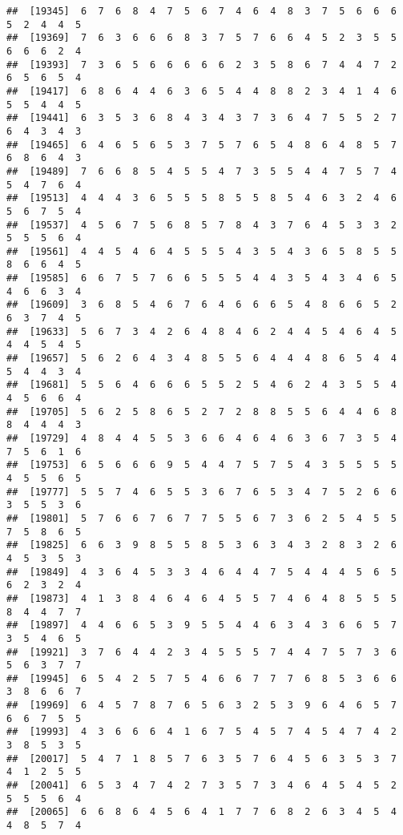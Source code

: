 \documentclass[
]{book}
\begin{document}
\begin{verbatim}
##  [19345]  6  7  6  8  4  7  5  6  7  4  6  4  8  3  7  5  6  6  6  5  2  4  4  5
##  [19369]  7  6  3  6  6  6  8  3  7  5  7  6  6  4  5  2  3  5  5  6  6  6  2  4
##  [19393]  7  3  6  5  6  6  6  6  6  2  3  5  8  6  7  4  4  7  2  6  5  6  5  4
##  [19417]  6  8  6  4  4  6  3  6  5  4  4  8  8  2  3  4  1  4  6  5  5  4  4  5
##  [19441]  6  3  5  3  6  8  4  3  4  3  7  3  6  4  7  5  5  2  7  6  4  3  4  3
##  [19465]  6  4  6  5  6  5  3  7  5  7  6  5  4  8  6  4  8  5  7  6  8  6  4  3
##  [19489]  7  6  6  8  5  4  5  5  4  7  3  5  5  4  4  7  5  7  4  5  4  7  6  4
##  [19513]  4  4  4  3  6  5  5  5  8  5  5  8  5  4  6  3  2  4  6  5  6  7  5  4
##  [19537]  4  5  6  7  5  6  8  5  7  8  4  3  7  6  4  5  3  3  2  5  5  5  6  4
##  [19561]  4  4  5  4  6  4  5  5  5  4  3  5  4  3  6  5  8  5  5  8  6  6  4  5
##  [19585]  6  6  7  5  7  6  6  5  5  5  4  4  3  5  4  3  4  6  5  4  6  6  3  4
##  [19609]  3  6  8  5  4  6  7  6  4  6  6  6  5  4  8  6  6  5  2  6  3  7  4  5
##  [19633]  5  6  7  3  4  2  6  4  8  4  6  2  4  4  5  4  6  4  5  4  4  5  4  5
##  [19657]  5  6  2  6  4  3  4  8  5  5  6  4  4  4  8  6  5  4  4  5  4  4  3  4
##  [19681]  5  5  6  4  6  6  6  5  5  2  5  4  6  2  4  3  5  5  4  4  5  6  6  4
##  [19705]  5  6  2  5  8  6  5  2  7  2  8  8  5  5  6  4  4  6  8  8  4  4  4  3
##  [19729]  4  8  4  4  5  5  3  6  6  4  6  4  6  3  6  7  3  5  4  7  5  6  1  6
##  [19753]  6  5  6  6  6  9  5  4  4  7  5  7  5  4  3  5  5  5  5  4  5  5  6  5
##  [19777]  5  5  7  4  6  5  5  3  6  7  6  5  3  4  7  5  2  6  6  3  5  5  3  6
##  [19801]  5  7  6  6  7  6  7  7  5  5  6  7  3  6  2  5  4  5  5  7  5  8  6  5
##  [19825]  6  6  3  9  8  5  5  8  5  3  6  3  4  3  2  8  3  2  6  4  5  3  5  3
##  [19849]  4  3  6  4  5  3  3  4  6  4  4  7  5  4  4  4  5  6  5  6  2  3  2  4
##  [19873]  4  1  3  8  4  6  4  6  4  5  5  7  4  6  4  8  5  5  5  8  4  4  7  7
##  [19897]  4  4  6  6  5  3  9  5  5  4  4  6  3  4  3  6  6  5  7  3  5  4  6  5
##  [19921]  3  7  6  4  4  2  3  4  5  5  5  7  4  4  7  5  7  3  6  5  6  3  7  7
##  [19945]  6  5  4  2  5  7  5  4  6  6  7  7  7  6  8  5  3  6  6  3  8  6  6  7
##  [19969]  6  4  5  7  8  7  6  5  6  3  2  5  3  9  6  4  6  5  7  6  6  7  5  5
##  [19993]  4  3  6  6  6  4  1  6  7  5  4  5  7  4  5  4  7  4  2  3  8  5  3  5
##  [20017]  5  4  7  1  8  5  7  6  3  5  7  6  4  5  6  3  5  3  7  4  1  2  5  5
##  [20041]  6  5  3  4  7  4  2  7  3  5  7  3  4  6  4  5  4  5  2  5  5  5  6  4
##  [20065]  6  6  8  6  4  5  6  4  1  7  7  6  8  2  6  3  4  5  4  4  8  5  7  4

\end{verbatim}
\end{document}
